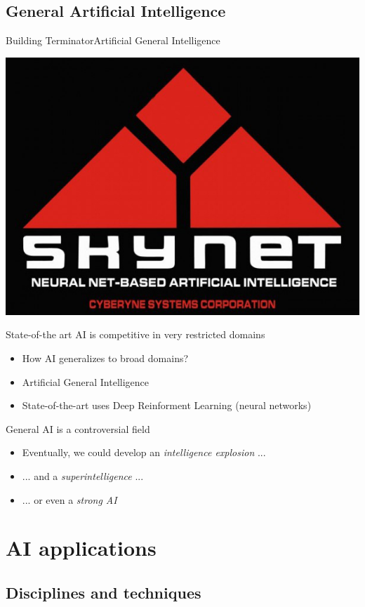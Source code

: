 \documentclass[10pt,compress]{beamer} %
\begin{document}
\subsection{General Artificial Intelligence}

\begin{frame}{Building Terminator}{Artificial General Intelligence}
	\begin{center}
		\includegraphics[width=0.3\linewidth]{figs/skynet.jpg}\\
    \end{center}

    State-of-the art AI is competitive in very restricted domains	
	\begin{itemize}
		\item How AI generalizes to broad domains? 
        \item \alert{Artificial General Intelligence}
        \item State-of-the-art uses Deep Reinforment Learning (neural networks)
	\end{itemize}

    General AI is a controversial field
    \begin{itemize}
        \item Eventually, we could develop an \textit{intelligence explosion} ...
        \item ... and a \textit{superintelligence} ...
        \item ... or even a \textit{strong AI}
    \end{itemize}
\end{frame}

\section{AI applications}
\subsection{Disciplines and techniques}
\end{document}
